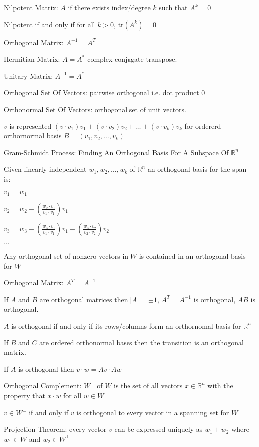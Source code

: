 Nilpotent Matrix: $A$ if there exists index/degree $k$ such that $A^k=0$

Nilpotent if and only if for all $k>0$, $\text{tr}(A^k)=0$

Orthogonal Matrix: $A^{-1}=A^T$

Hermitian Matrix: $A=A^*$ complex conjugate transpose.

Unitary Matrix: $A^{-1}=A^*$

Orthogonal Set Of Vectors: pairwise orthogonal i.e. dot product $0$

Orthonormal Set Of Vectors: orthogonal set of unit vectors.

$v$ is represented $(v \cdot v_1) v_1 + (v \cdot v_2) v_2 + \dots + (v \cdot v_k) v_k$ for ordererd orthornormal basis $B=(v_1,v_2,\dots,v_k)$

Gram-Schmidt Process: Finding An Orthogonal Basis For A Subspace Of $\mathbb{R}^n$

Given linearly independent ${w_1,w_2,\dots,w_k}$ of $\mathbb{R}^n$ an orthogonal basis for the span is:

$v_1 = w_1$

$v_2 = w_2 - \left(\frac{w_2 \cdot v_1}{v_1 \cdot v_1} \right) v_1$

$v_3 = w_3 - \left(\frac{w_3 \cdot v_1}{v_1 \cdot v_1} \right) v_1 - \left(\frac{w_3 \cdot v_2}{v_2 \cdot v_2} \right) v_2$

$\dots$

Any orthogonal set of nonzero vectors in $W$ is contained in an orthogonal basis for $W$

Orthogonal Matrix: $A^T = A^{-1}$

If $A$ and $B$ are orthogonal matrices then $|A|=\pm 1$, $A^T=A^{-1}$ is orthogonal, $AB$ is orthogonal.

$A$ is orthogonal if and only if its rows/columns form an orthornomal basis for $\mathbb{R}^n$

If $B$ and $C$ are ordered orthonormal bases then the transition is an orthogonal matrix.

If $A$ is orthogonal then $v \cdot w = Av \cdot Aw$

Orthogonal Complement: $W^{\perp}$ of $W$ is the set of all vectors $x \in \mathbb{R}^n$ with the property that $x \cdot w$ for all $w \in W$

$v \in W^{\perp}$ if and only if $v$ is orthogonal to every vector in a spanning set for $W$

Projection Theorem: every vector $v$ can be expressed uniquely as $w_1+w_2$ where $w_1 \in W$ and $w_2 \in W^{\perp}$

